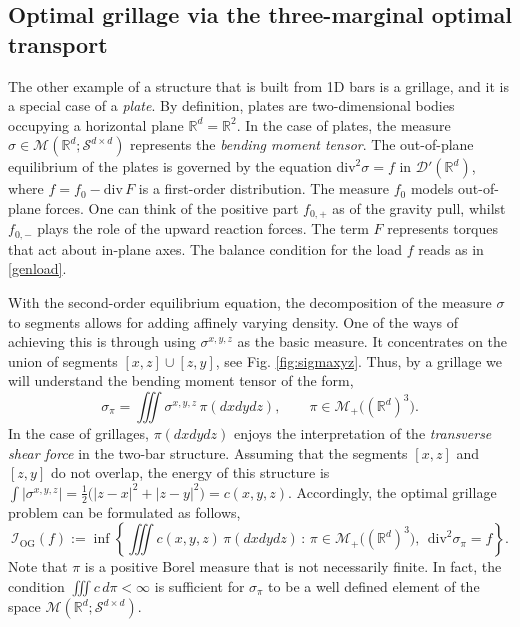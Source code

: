 \documentclass[11pt,letterpaper,reqno]{amsart}
\theoremstyle{definition}
\numberwithin{equation}{section}
\newcommand{\R}{\mathbb{R}}
\newcommand{\Rd}{\R^d}
\newcommand{\Mes}{{\mathcal{M}}}
\newcommand{\dive}{{\mathrm{div}}}
\newcommand{\abs}[1]{{\left \lvert #1 \right \rvert}}
\newcommand{\D}{\mathcal{D}}
\newcommand{\Sdd}{{\mathcal{S}^{d \times d}}}
\begin{document}
{\subsection{Optimal grillage via the three-marginal optimal transport}

The other example of a structure that is built from 1D bars is a grillage, and it is a special case of a \textit{plate}. By definition, plates are two-dimensional bodies occupying a horizontal plane $\R^d = \R^2$. In the case of plates, the measure $\sigma \in \Mes(\Rd;\Sdd)$ represents the \textit{bending moment tensor}. The out-of-plane equilibrium of the plates is governed by the equation $\dive^2 \sigma = f$ in $\D'(\Rd)$, where  $f=f_0 -\dive\,F$ is a first-order distribution. The measure $f_0$ models out-of-plane forces. One can think of the positive part $f_{0,+}$ as of the gravity pull, whilst $f_{0,-}$ plays the role of the upward reaction forces. The term $F$ represents torques that act about in-plane axes. The balance condition for the load $f$ reads as in \eqref{genload}.

With the second-order equilibrium equation, the decomposition of the measure $\sigma$ to segments allows for adding affinely varying density. One of the ways of achieving this is through using $\sigma^{x,y,z}$ as the basic measure. It concentrates on the union of segments $[x,z] \cup [z,y]$, see  {Fig. \ref{fig:sigmaxyz}.} Thus, by a grillage we will understand the bending moment tensor of the form,
\begin{equation}
	\label{eq:sigma_pi}
	\sigma_\pi = \iiint \sigma^{x,y,z} \, \pi(dxdydz), \qquad \pi \in \Mes_+\big((\Rd)^3 \big).
\end{equation}
In the case of grillages, $\pi(dxdydz)$ enjoys the interpretation of the \textit{transverse shear force} in the two-bar structure. 
Assuming that the segments $[x,z]$ and $[z,y]$ do not overlap, the energy of this structure is $\int \abs{\sigma^{x,y,z}} = \frac{1}{2}\big(\abs{z-x}^2 + \abs{z-y}^2\big) = c(x,y,z)$. Accordingly, the optimal grillage problem can be formulated  as follows,
\begin{equation*}
	\mathcal{I}_{\mathrm{OG}}(f) := \inf\left\{ \iiint c(x,y,z)\, \pi(dxdydz)\, : \, \pi \in \Mes_+\big((\Rd)^3 \big) , \ \ \dive^2 \sigma_\pi = f  \right\}.
\end{equation*}
Note that $\pi$ is a positive Borel measure that is not necessarily finite. In fact, the condition $\iiint c\,d\pi < \infty$ is sufficient for $\sigma_\pi$ to be a well defined element of the space $\Mes(\Rd;\Sdd)$.

}
\end{document}
